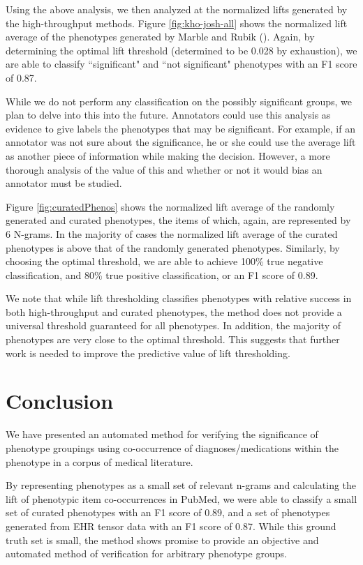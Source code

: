 \documentclass{sig-alternate-05-2015}
\begin{document}
Using the above analysis, we then analyzed at the normalized lifts generated by the high-throughput methods. Figure \ref{fig:kho-josh-all} shows the normalized lift average of the phenotypes generated by Marble and Rubik (\cite {Ho:2014jc,Ho:2014da, wang2015rubik}). 
Again, by determining the optimal lift threshold (determined to be 0.028 by exhaustion), we are able to classify ``significant" and ``not significant" phenotypes with an F1 score of 0.87. 

While we do not perform any classification on the possibly significant groups, we plan to delve into this into the future.
Annotators could use this analysis as evidence to give labels the phenotypes that may be significant.
For example, if an annotator was not sure about the significance, he or she could use the average lift as another piece of information while making the decision.
However, a more thorough analysis of the value of this and whether or not it would bias an annotator must be studied.

Figure \ref{fig:curatedPhenos} shows the normalized lift average of the randomly generated and curated phenotypes, the items of which, again, are represented by 6 N-grams. 
In the majority of cases the normalized lift average of the curated phenotypes is above that of the randomly generated phenotypes. 
Similarly, by choosing the optimal threshold, we are able to achieve 100\% true negative classification, and 80\% true positive classification, or an F1 score of 0.89.

We note that while lift thresholding classifies phenotypes with relative success in both high-throughput and curated phenotypes, the method does not provide a universal threshold guaranteed for all phenotypes. In addition, the majority of phenotypes are very close to the optimal threshold. This suggests that further work is needed to improve the predictive value of lift thresholding.

\section{Conclusion}
We have presented an automated method for verifying the significance of phenotype groupings using co-occurrence of diagnoses/medications within the phenotype in a corpus of medical literature. 

By representing phenotypes as a small set of relevant n-grams and calculating the lift of phenotypic item co-occurrences in PubMed, we were able to classify a small set of curated phenotypes with an F1 score of 0.89, and a set of phenotypes generated from EHR tensor data with an F1 score of 0.87. While this ground truth set is small, the method shows promise to provide an objective and automated method of verification for arbitrary phenotype groups. 
\end{document}
